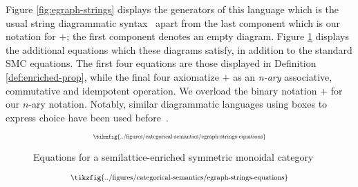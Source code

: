 Figure \ref{fig:egraph-strings} displays the generators of this language which is the usual string diagrammatic syntax~\cite{Selinger_2010} apart from the last component which is our notation for $+$; the first component denotes an empty diagram. 
Figure \ref{fig:string-equations} displays the additional equations which these diagrams satisfy, in addition to the standard SMC equations. 
The first four equations are those displayed in Definition \ref{def:enriched-prop},  while the final four axiomatize $+$ as an \textit{n-ary} associative, commutative and idempotent operation.  We overload the binary notation $+$ for our $n$-ary notation.
Notably, similar diagrammatic languages using boxes to express choice have been used before~\cite{duncan_generalised_2009}. 

\ifdefined \ONECOLUMN
\begin{figure}
	\[  
		\scalebox{0.6}{
		\tikzfig{../figures/categorical-semantics/egraph-strings-equations}
		}
	\]
	\caption{Equations for a  semilattice-enriched symmetric monoidal category}
	\label{fig:string-equations}
	\end{figure}
\else
\begin{figure*}
\[  
    \scalebox{0.75}{
	\tikzfig{../figures/categorical-semantics/egraph-strings-equations}
    }
\]
\captionsetup{skip=0pt}
\caption{Equations for a  semilattice-enriched symmetric monoidal category}
\label{fig:string-equations}
\vspace{-8mm}
\end{figure*}
\fi